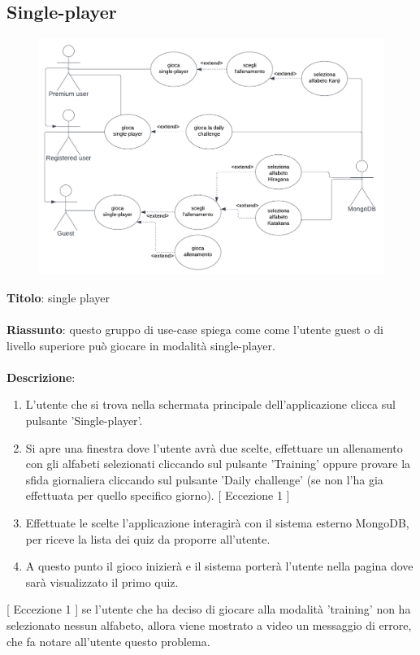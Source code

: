 \newpage
\subsection{Single-player} \label{req_single-player}
\begin{figure}[!h]
\centering
\includegraphics[scale=0.35]{images/use_case_single-player.png}
\end{figure}
\noindent
\textbf{Titolo}: single player \\
\\
\textbf{Riassunto}: questo gruppo di use-case spiega come come l'utente guest o di livello superiore può giocare in modalità single-player.  \\
\\
\textbf{Descrizione}:
\begin{enumerate}
    \item L'utente che si trova nella schermata principale dell'applicazione clicca sul pulsante 'Single-player'.
    \item Si apre una finestra dove l'utente avrà due scelte, effettuare un allenamento con gli alfabeti selezionati cliccando sul pulsante 'Training' oppure provare la sfida giornaliera cliccando sul pulsante 'Daily challenge' (se non l'ha gia effettuata per quello specifico giorno). {[ Eccezione 1 ]}
    \item Effettuate le scelte l'applicazione interagirà con il sistema esterno MongoDB, per riceve la lista dei quiz da proporre all'utente.
    \item A questo punto il gioco inizierà e il sistema porterà l'utente nella pagina dove sarà visualizzato il primo quiz.
\end{enumerate}
{[ Eccezione 1 ]} se l'utente che ha deciso di giocare alla modalità 'training' non ha selezionato nessun alfabeto, allora viene mostrato a video un messaggio di errore, che fa notare all'utente questo problema.

